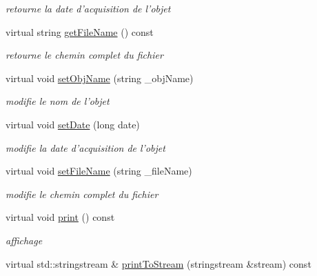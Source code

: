 \begin{DoxyCompactItemize}
\begin{DoxyCompactList}\small\item\em retourne la date d'acquisition de l'objet \end{DoxyCompactList}\item 
\hypertarget{classSource_ad3b0a944c39d7276a777e5bb0b311b87}{virtual string \hyperlink{classSource_ad3b0a944c39d7276a777e5bb0b311b87}{get\-File\-Name} () const }\label{classSource_ad3b0a944c39d7276a777e5bb0b311b87}

\begin{DoxyCompactList}\small\item\em retourne le chemin complet du fichier \end{DoxyCompactList}\item 
\hypertarget{classSource_a156a1f9c3491338d0999b2e9c92877a7}{virtual void \hyperlink{classSource_a156a1f9c3491338d0999b2e9c92877a7}{set\-Obj\-Name} (string \-\_\-obj\-Name)}\label{classSource_a156a1f9c3491338d0999b2e9c92877a7}

\begin{DoxyCompactList}\small\item\em modifie le nom de l'objet \end{DoxyCompactList}\item 
\hypertarget{classSource_a7ff11a007b50f85f26940f9e7feea7c2}{virtual void \hyperlink{classSource_a7ff11a007b50f85f26940f9e7feea7c2}{set\-Date} (long date)}\label{classSource_a7ff11a007b50f85f26940f9e7feea7c2}

\begin{DoxyCompactList}\small\item\em modifie la date d'acquisition de l'objet \end{DoxyCompactList}\item 
\hypertarget{classSource_a96ef6caf2dcf27f6f8b62a128cf912a1}{virtual void \hyperlink{classSource_a96ef6caf2dcf27f6f8b62a128cf912a1}{set\-File\-Name} (string \-\_\-file\-Name)}\label{classSource_a96ef6caf2dcf27f6f8b62a128cf912a1}

\begin{DoxyCompactList}\small\item\em modifie le chemin complet du fichier \end{DoxyCompactList}\item 
\hypertarget{classSource_a4fe532fb822809ff3bd70560a04908bd}{virtual void \hyperlink{classSource_a4fe532fb822809ff3bd70560a04908bd}{print} () const }\label{classSource_a4fe532fb822809ff3bd70560a04908bd}

\begin{DoxyCompactList}\small\item\em affichage \end{DoxyCompactList}\item 
\hypertarget{classSource_aee6e77aa558275f03bb6485d2ed0560f}{virtual std\-::stringstream \& \hyperlink{classSource_aee6e77aa558275f03bb6485d2ed0560f}{print\-To\-Stream} (stringstream \&stream) const }\label{classSource_aee6e77aa558275f03bb6485d2ed0560f}


\end{DoxyCompactItemize}
